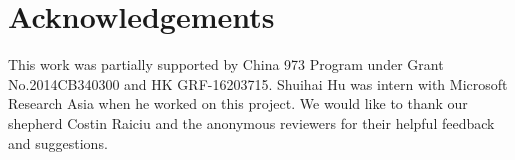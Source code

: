 \documentclass[sigconf]{acmart}
\begin{document}




	\maketitle
	
	
	
	
	
	
	
	
	
	
	
	
%	
	
	\section*{Acknowledgements}
	This work was partially supported by China 973 Program under Grant No.2014CB340300 and HK GRF-16203715. Shuihai Hu was intern with Microsoft Research Asia when he worked on this project. We would like to thank our shepherd Costin Raiciu and the anonymous reviewers for
	their helpful feedback and suggestions.
	
	
	
	
\end{document}
